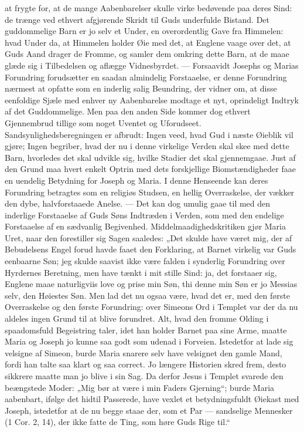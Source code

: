 \documentclass[12pt,a4paper]{book}
\begin{document}
at frygte for, at de mange Aabenbarelser skulle virke bedøvende paa deres Sind: de
trænge ved ethvert afgjørende Skridt til Guds underfulde Bistand. Det guddommelige
Barn er jo selv et Under, en overordentlig Gave fra Himmelen: hvad Under da, at
Himmelen holder Øie med det, at Englene vaage over det, at Guds Aand drager de
Fromme, og samler dem omkring dette Barn, at de maae glæde sig i Tilbedelsen og
aflægge Vidnesbyrdet. --- Forsaavidt Josephs og Marias Forundring forudsætter en
saadan almindelig Forstaaelse, er denne Forundring nærmest at opfatte som en inderlig
salig Beundring, der vidner om, at disse eenfoldige Sjæle med enhver ny Aabenbarelse
modtage et nyt, oprindeligt Indtryk af det Guddommelige. Men paa den anden Side
kommer dog ethvert Gjennembrud tillige som noget Uventet og Uforudseet.
Sandsynlighedsberegningen er afbrudt: Ingen veed, hvad Gud i næste Øieblik vil gjøre;
Ingen begriber, hvad der nu i denne virkelige Verden skal skee med dette Barn,
hvorledes det skal udvikle sig, hvilke Stadier det skal gjennemgaae. Just af den
Grund maa hvert enkelt Optrin med dets forskjellige Biomstændigheder faae en uendelig
Betydning for Joseph og Maria. I denne Henseende kan deres Forundring betragtes som en
religiøs Studsen, en hellig Overraskelse, der vækker den dybe, halvforstaaede Anelse.
--- Det kan dog umulig gaae til med den inderlige Forstaaelse af Guds Søns Indtræden i
Verden, som med den endelige Forstaaelse af en sædvanlig Begivenhed.
Middelmaadighedskritiken gjør Maria Uret, naar den forestiller sig Sagen saaledes:
„Det skulde have været mig, der af Bebudelsens Engel forud havde faaet den Forklaring,
at Barnet virkelig var Guds eenbaarne Søn; jeg skulde saavist ikke være falden i
synderlig Forundring over Hyrdernes Beretning, men have tænkt i mit stille
Sind: ja, det forstaaer sig, Englene maae naturligviis love og prise min Søn, thi
denne min Søn er jo Messias selv, den Høiestes Søn. Men lad det nu ogsaa være, hvad
det er, med den første Overraskelse og den første Forundring: over Simeons Ord i
Templet var der da nu aldeles ingen Grund til at blive forundret. Alt, hvad den fromme
Olding i spaadomsfuld Begeistring taler, idet han holder Barnet paa sine Arme, maatte
Maria og Joseph jo kunne saa godt som udenad i Forveien. Istedetfor at lade sig
velsigne af Simeon, burde Maria snarere selv have velsignet den gamle Mand, fordi han
talte saa klart og saa correct. Jo længere Historien skred frem, desto sikkrere maatte
man jo blive i sin Sag. Da derfor Jesus i Templet svarede den beængstede Moder: „Mig
bør at være i min Faders Gjerning“; burde Maria aabenbart, ifølge det hidtil
Passerede, have vexlet et betydningsfuldt Øiekast med Joseph, istedetfor at de nu
begge staae der, som et Par --- sandselige Mennesker (1 Cor. 2, 14), der ikke fatte de
Ting, som høre Guds Rige til.“
\end{document}
